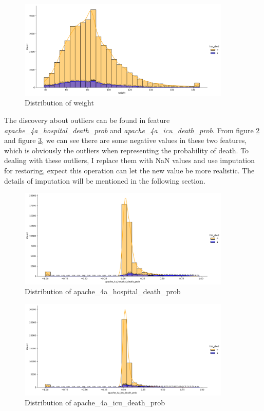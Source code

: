\documentclass[a4paper, oneside, final, 12pt]{scrartcl} %
\begin{document}
\begin{figure}[h]
  \centering
  \includegraphics[width=0.9\textwidth]{"./image/dataset/weight_dis.png"}
  \caption{Distribution of weight}
  \label{fig:weight}
\end{figure}

The discovery about outliers can be found in 
feature \emph{apache\_4a\_hospital\_death\_prob} and \emph{apache\_4a\_icu\_death\_prob}.
From figure \ref{fig:apache_4a_hospital_death_prob} and figure \ref{fig:apache_4a_icu_death_prob},
we can see there are some negative values in these two features,
which is obviously the outliers when representing the probability of death.
To dealing with these outliers, I replace them with NaN values and use imputation for restoring,
expect this operation can let the new value be more realistic.
The details of imputation will be mentioned in the following section.

\begin{figure}[h]
  \centering
  \includegraphics[width=0.9\textwidth]{"./image/dataset/hospital_death_prob_dis.png"}
  \caption{Distribution of apache\_4a\_hospital\_death\_prob}
  \label{fig:apache_4a_hospital_death_prob}
\end{figure}

\begin{figure}[h]
  \centering
  \includegraphics[width=0.9\textwidth]{"./image/dataset/icu_death_prob_dis.png"}
  \caption{Distribution of apache\_4a\_icu\_death\_prob}
  \label{fig:apache_4a_icu_death_prob}
\end{figure}
\end{document}
